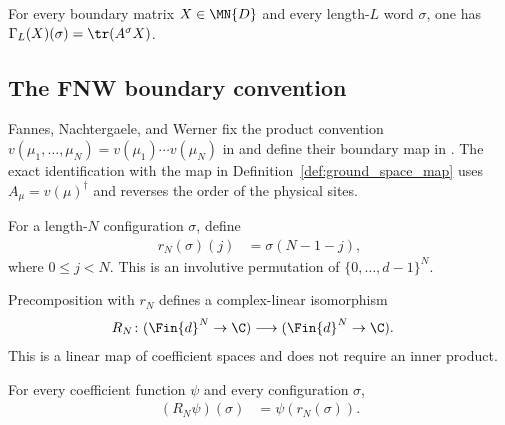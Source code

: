 \begin{lemma}\label{lem:ground_space_map_apply}
    \leanok
    For every boundary matrix $X\in\MN{D}$ and every length-$L$ word $\sigma$,
    one has $\Gamma_L(X)(\sigma)=\tr(A^\sigma X)$.
\end{lemma}

\subsection{The FNW boundary convention}\label{subsec:fnw_boundary_convention}

Fannes, Nachtergaele, and Werner fix the product convention
$v(\mu_1,\ldots,\mu_N)=v(\mu_1)\cdots v(\mu_N)$ in
\cite[Equation~(5.4)]{Fannes1992Finitely} and define their boundary map in
\cite[Equation~(5.5)]{Fannes1992Finitely}.  The exact identification with the
map in Definition~\ref{def:ground_space_map} uses
$A_\mu=v(\mu)^\dagger$ and reverses the order of the physical sites.

\begin{definition}
    \label{def:physical_site_reverse_config_equiv}
    \leanok
    For a length-$N$ configuration $\sigma$, define
    \begin{align}
        r_N(\sigma)(j)
         & =\sigma(N-1-j),
        \label{eq:fnw_config_reverse}
    \end{align}
    where $0\leq j<N$.  This is an involutive permutation of
    $\{0,\ldots,d-1\}^{N}$.
\end{definition}

\begin{definition}
    \label{def:physical_site_reverse}
    \leanok
    Precomposition with $r_N$ defines a complex-linear isomorphism
    \begin{align}
        R_N\colon(\Fin{d}^{N}\to\C)
         & \longrightarrow(\Fin{d}^{N}\to\C).
        \label{eq:fnw_site_reverse_map}
    \end{align}
    This is a linear map of coefficient spaces and does not require an inner
    product.
\end{definition}

\begin{lemma}
    \label{thm:physical_site_reverse_apply}
    \leanok
    For every coefficient function $\psi$ and every configuration $\sigma$,
    \begin{align}
        (R_N\psi)(\sigma)
         & =\psi(r_N(\sigma)).
        \label{eq:fnw_site_reverse_apply}
    \end{align}
\end{lemma}

